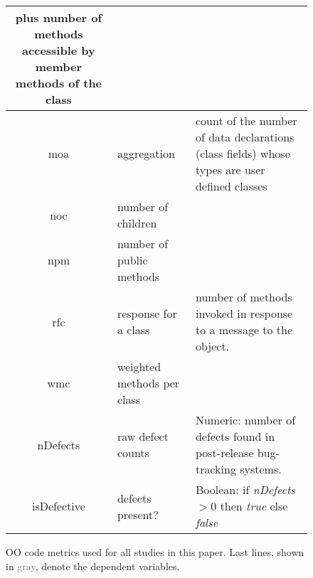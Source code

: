 \begin{figure*}[tb]
\begin{center}
{\begin{tabular}{c|l|p{4.7in}}
				plus number of methods accessible by member methods of the
				class\\\hline
				moa &  aggregation &  count of the number of data declarations (class
				fields) whose types are user defined classes\\\hline
				noc &  number of children &\\\hline
				npm & number of public methods & \\\hline
				rfc & response for a class &number of  methods invoked in response to
				a message to the object.\\\hline
				wmc & weighted methods per class &\\\hline
				\rowcolor{lightgray}
				nDefects & raw defect counts & Numeric: number of defects found in post-release bug-tracking systems.\\
				\rowcolor{lightgray}
				isDefective & defects present? & Boolean: if {\em nDefects} $>0$ then {\em true} else {\em false}
			\end{tabular}
		}
	\end{center}
	\caption{OO code metrics used for all studies in this paper.
	   Last lines, shown in \textcolor{gray}{gray}, denote the dependent variables.}\label{fig:static_metrics}
\end{figure*}